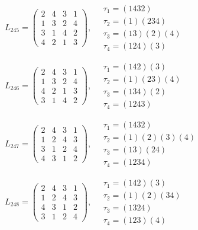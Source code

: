 $L_{245} = \begin{pmatrix} 2 & 4 & 3 & 1 \\ 1 & 3 & 2 & 4 \\ 3 & 1 & 4 & 2 \\ 4 & 2 & 1 & 3 \end{pmatrix}, \quad \begin{matrix} \tau_{1} = (1 4 3 2) \\ \tau_{2} = (1)(2 3 4) \\ \tau_{3} = (1 3)(2)(4) \\ \tau_{4} = (1 2 4)(3) \end{matrix}$

$L_{246} = \begin{pmatrix} 2 & 4 & 3 & 1 \\ 1 & 3 & 2 & 4 \\ 4 & 2 & 1 & 3 \\ 3 & 1 & 4 & 2 \end{pmatrix}, \quad \begin{matrix} \tau_{1} = (1 4 2)(3) \\ \tau_{2} = (1)(2 3)(4) \\ \tau_{3} = (1 3 4)(2) \\ \tau_{4} = (1 2 4 3) \end{matrix}$

$L_{247} = \begin{pmatrix} 2 & 4 & 3 & 1 \\ 1 & 2 & 4 & 3 \\ 3 & 1 & 2 & 4 \\ 4 & 3 & 1 & 2 \end{pmatrix}, \quad \begin{matrix} \tau_{1} = (1 4 3 2) \\ \tau_{2} = (1)(2)(3)(4) \\ \tau_{3} = (1 3)(2 4) \\ \tau_{4} = (1 2 3 4) \end{matrix}$

$L_{248} = \begin{pmatrix} 2 & 4 & 3 & 1 \\ 1 & 2 & 4 & 3 \\ 4 & 3 & 1 & 2 \\ 3 & 1 & 2 & 4 \end{pmatrix}, \quad \begin{matrix} \tau_{1} = (1 4 2)(3) \\ \tau_{2} = (1)(2)(3 4) \\ \tau_{3} = (1 3 2 4) \\ \tau_{4} = (1 2 3)(4) \end{matrix}$

